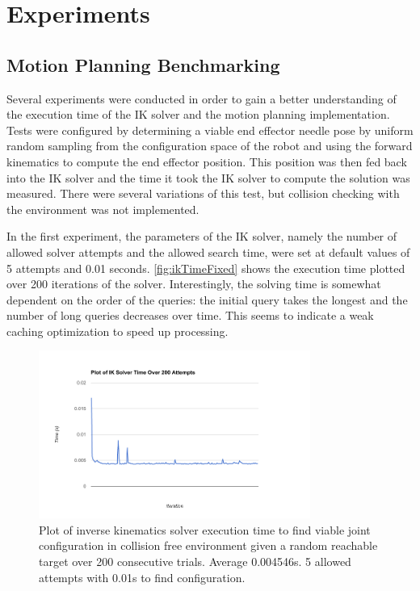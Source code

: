 \documentclass[12pt]{report}
\begin{document}
\chapter{Experiments}
\section{Motion Planning Benchmarking}
Several experiments were conducted in order to gain a better understanding of the execution time of the IK solver and the motion planning implementation. Tests were configured by determining a viable end effector needle pose by uniform random sampling from the configuration space of the robot and using the forward kinematics to compute the end effector position. This position was then fed back into the IK solver and the time it took the IK solver to compute the solution was measured. There were several variations of this test, but collision checking with the environment was not implemented.

In the first experiment, the parameters of the IK solver, namely the number of allowed solver attempts and the allowed search time, were set at default values of 5 attempts and 0.01 seconds. \autoref{fig:ikTimeFixed} shows the execution time plotted over 200 iterations of the solver. Interestingly, the solving time is somewhat dependent on the order of the queries: the initial query takes the longest and the number of long queries decreases over time. This seems to indicate a weak caching optimization to speed up processing.

\begin{figure}[thpb]
	\centering
	\includegraphics[width = 3.5in]{graphs/ik_solver_fixed_stats.png}
    \caption{Plot of inverse kinematics solver execution time to find viable joint configuration in collision free environment given a random reachable target over 200 consecutive trials. Average 0.004546s. 5 allowed attempts with 0.01s to find configuration.}
    \label{fig:ikTimeFixed}
\end{figure}
\end{document}
